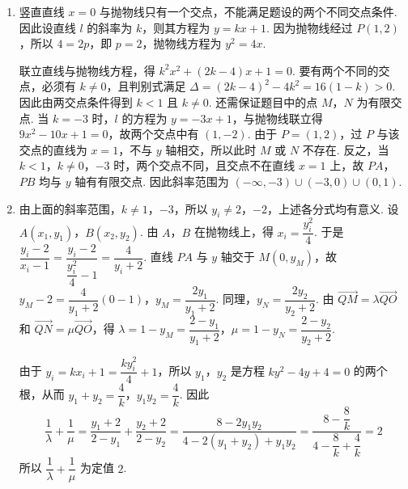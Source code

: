 \begin{solution}
\begin{enumerate}
    \item 竖直直线 \(x=0\) 与抛物线只有一个交点，不能满足题设的两个不同交点条件. 因此设直线 \(l\) 的斜率为 \(k\)，则其方程为 \(y=kx+1\). 因为抛物线经过 \(P(1,2)\)，所以 \(4=2p\)，即 \(p=2\)，抛物线方程为 \(y^2=4x\).

    联立直线与抛物线方程，得 \(k^2x^2+(2k-4)x+1=0\). 要有两个不同的交点，必须有 \(k\ne0\)，且判别式满足 \(\Delta=(2k-4)^2-4k^2=16(1-k)>0\). 因此由两交点条件得到 \(k<1\) 且 \(k\ne0\).
    还需保证题目中的点 \(M\)，\(N\) 为有限交点. 当 \(k=-3\) 时，\(l\) 的方程为 \(y=-3x+1\)，与抛物线联立得 \(9x^2-10x+1=0\)，故两个交点中有 \((1,-2)\). 由于 \(P=(1,2)\)，过 \(P\) 与该交点的直线为 \(x=1\)，不与 \(y\) 轴相交，所以此时 \(M\) 或 \(N\) 不存在. 反之，当 \(k<1\)，\(k\ne0\)，\(-3\) 时，两个交点不同，且交点不在直线 \(x=1\) 上，故 \(PA\)，\(PB\) 均与 \(y\) 轴有有限交点. 因此斜率范围为 \((-\infty,-3)\cup(-3,0)\cup(0,1)\).
    \item 由上面的斜率范围，\(k\ne1\)，\(-3\)，所以 \(y_i\ne2\)，\(-2\)，上述各分式均有意义. 设 \(A(x_1,y_1)\)，\(B(x_2,y_2)\). 由 \(A\)，\(B\) 在抛物线上，得 \(x_i=\dfrac{y_i^2}{4}\). 于是 \(\dfrac{y_i-2}{x_i-1}=\dfrac{y_i-2}{\dfrac{y_i^2}{4}-1}=\dfrac4{y_i+2}\). 直线 \(PA\) 与 \(y\) 轴交于 \(M(0,y_M)\)，故 \(y_M-2=\dfrac4{y_1+2}(0-1)\)，\(y_M=\dfrac{2y_1}{y_1+2}\). 同理，\(y_N=\dfrac{2y_2}{y_2+2}\). 由 \(\overrightarrow{QM}=\lambda\overrightarrow{QO}\) 和 \(\overrightarrow{QN}=\mu\overrightarrow{QO}\)，得 \(\lambda=1-y_M=\dfrac{2-y_1}{y_1+2}\)，\(\mu=1-y_N=\dfrac{2-y_2}{y_2+2}\).

    由于 \(y_i=kx_i+1=\dfrac{k y_i^2}{4}+1\)，所以 \(y_1\)，\(y_2\) 是方程 \(ky^2-4y+4=0\) 的两个根，从而 \(y_1+y_2=\dfrac4k\)，\(y_1y_2=\dfrac4k\).
    因此
    \[
    \dfrac1\lambda+\dfrac1\mu
    =\dfrac{y_1+2}{2-y_1}+\dfrac{y_2+2}{2-y_2}
    =\dfrac{8-2y_1y_2}{4-2(y_1+y_2)+y_1y_2}
    =\dfrac{8-\dfrac8k}{4-\dfrac8k+\dfrac4k}=2
    \]
    所以 \(\dfrac1\lambda+\dfrac1\mu\) 为定值 \(2\).
\end{enumerate}
\end{solution}

